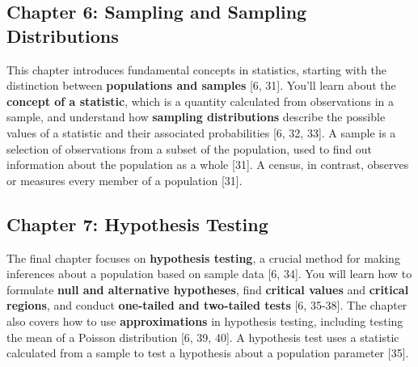 \documentclass{article}
\begin{document}
\subsection*{Chapter 6: Sampling and Sampling Distributions}
This chapter introduces fundamental concepts in statistics, starting with the distinction between \textbf{populations and samples} [6, 31]. You'll learn about the \textbf{concept of a statistic}, which is a quantity calculated from observations in a sample, and understand how \textbf{sampling distributions} describe the possible values of a statistic and their associated probabilities [6, 32, 33]. A sample is a selection of observations from a subset of the population, used to find out information about the population as a whole [31]. A census, in contrast, observes or measures every member of a population [31].

\subsection*{Chapter 7: Hypothesis Testing}
The final chapter focuses on \textbf{hypothesis testing}, a crucial method for making inferences about a population based on sample data [6, 34]. You will learn how to formulate \textbf{null and alternative hypotheses}, find \textbf{critical values} and \textbf{critical regions}, and conduct \textbf{one-tailed and two-tailed tests} [6, 35-38]. The chapter also covers how to use \textbf{approximations} in hypothesis testing, including testing the mean of a Poisson distribution [6, 39, 40]. A hypothesis test uses a statistic calculated from a sample to test a hypothesis about a population parameter [35].
\end{document}
